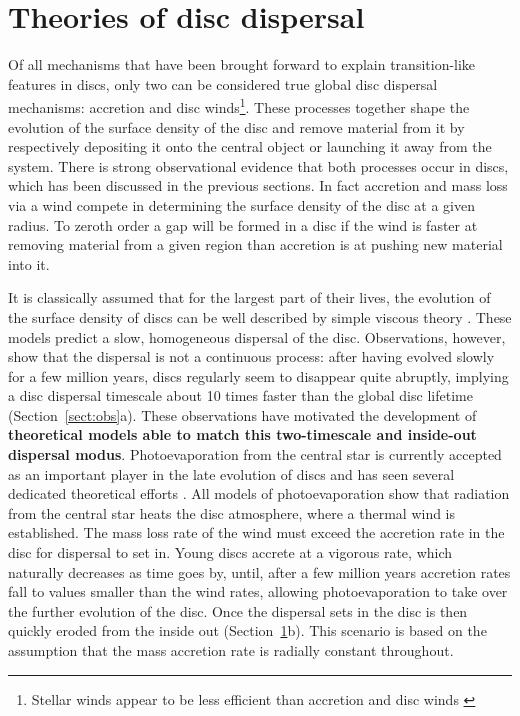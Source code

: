 \documentclass{rsos}
\begin{document}
\section{Theories of disc dispersal}\label{sect:theory}

Of all mechanisms that have been brought forward to explain transition-like features in discs, only two can be considered true global disc dispersal mechanisms: accretion and disc winds\footnote{Stellar winds appear to be less efficient than accretion and disc winds 
\cite{2009ApJ...700...10M}}. These processes together shape the evolution of the surface density of the disc and remove material from it by respectively depositing it onto the central object or launching it away from the system. There is strong observational evidence that both processes occur in discs, which has been discussed in the previous sections. In fact accretion and mass loss via a wind compete in determining the surface density of the disc at a given radius. To zeroth order a gap will be formed in a disc if the wind is faster at removing material from a given region than accretion is at pushing new material into it. 

It is classically assumed that for the largest part of their lives, the evolution of the surface density of discs can be well described by simple viscous theory 
\cite{1998ApJ...495..385H,1974MNRAS.168..603L}. These models predict a slow, homogeneous dispersal of the disc. Observations, however, show that the dispersal is not a continuous process: after having evolved slowly %
for a few million years, discs regularly seem to disappear quite abruptly, implying a disc dispersal timescale about 10 times faster than the global disc lifetime (Section~\ref{sect:obs}a). These observations have motivated the development of {\bf theoretical models able to match this two-timescale and inside-out dispersal modus}. Photoevaporation from the central star is currently accepted as an important  player in the late evolution of discs and has seen several dedicated theoretical efforts 
\cite{2001MNRAS.328..485C, 2006MNRAS.369..216A, 2006MNRAS.369..229A, 2008ApJ...688..398E, 2010MNRAS.401.1415O, 2011MNRAS.412...13O, 2012MNRAS.422.1880O, 2009ApJ...705.1237G}. All models of photoevaporation show that radiation from the central star heats the disc atmosphere, where a thermal wind is established. The mass loss rate of the wind must exceed the accretion rate in the disc for dispersal to set in. Young discs accrete at a vigorous rate, which naturally decreases as time goes by, until, after a few million years accretion rates fall to values smaller than the wind rates, allowing photoevaporation to take over the further evolution of the disc. Once the dispersal sets in the disc is then quickly eroded from the inside out (Section~\ref{sect:theory}b). This scenario is based on the assumption that the mass accretion rate is radially constant throughout.
\end{document}
